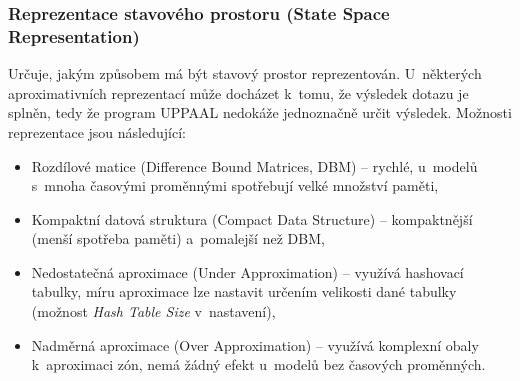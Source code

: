 \subsubsection{Reprezentace stavového prostoru (State Space Representation)}
Určuje, jakým způsobem má být stavový prostor reprezentován. U~některých aproximativních reprezentací může docházet k~tomu, že výsledek dotazu je  splněn, tedy že program UPPAAL nedokáže jednoznačně určit výsledek. Možnosti reprezentace jsou následující:
\begin{itemize}
    \item Rozdílové matice (Difference Bound Matrices, DBM) -- rychlé, u~modelů s~mnoha časovými proměnnými spotřebují velké množství paměti,
    \item Kompaktní datová struktura (Compact Data Structure) -- kompaktnější (menší spotřeba paměti) a~pomalejší než DBM,
    \item Nedostatečná aproximace (Under Approximation) -- využívá hashovací tabulky, míru aproximace lze nastavit určením velikosti dané tabulky (možnost \textit{Hash Table Size} v~nastavení),
    \item Nadměrná aproximace (Over Approximation) -- využívá komplexní obaly k~aproximaci zón, nemá žádný efekt u~modelů bez časových proměnných.
\end{itemize}

